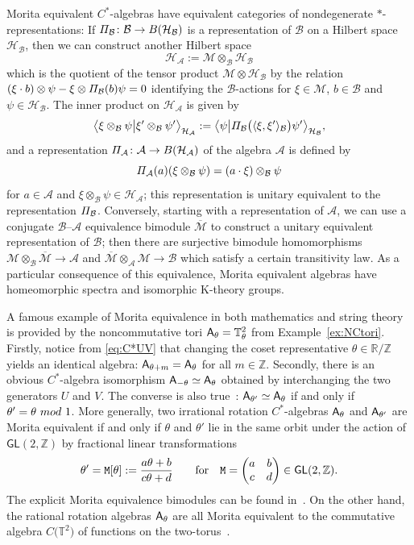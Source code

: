 \documentclass[11pt]{article}
\numberwithin{equation}{section}
\numberwithin{equation}{section}
\newcommand{\Z}{\zed}
\def\A{{\sf A}}
\newcommand{\sfGL}{\mathsf{GL}}
\newcommand{\Pim}{{\mit\Pi}}
\newcommand{\rmB}{{\rm B}}
\newcommand{\zed}{{\mathbb Z}} %
\newcommand{\real}{{\mathbb R}} %
\newcommand{\torus}{{\mathbb T}} %
\def\alg{{\mathcal A}}
\def\balg{{\mathcal B}}
\def\hil{{\mathcal H}}
\def\Mcal{{\mathcal M}}
\begin{document}
Morita equivalent $C^*$-algebras have equivalent categories of
nondegenerate $*$-representations: If $\Pim_\balg\colon \balg\to{\rm B}(\hil_\balg)$ is a
representation of $\balg$ on a Hilbert space $\hil_\balg$, then we can
construct another Hilbert space
\[
\hil_\alg:=\Mcal\otimes_\balg\hil_\balg
\]
which is the quotient of the tensor product $\Mcal\otimes\hil_\balg$ by the relation $(\xi\cdot
b)\otimes\psi-\xi\otimes\Pim_\balg(b)\psi=0$ identifying the
$\balg$-actions for
$\xi\in\Mcal$, $b\in\balg$ and $\psi\in\hil_\balg$. The inner product
on $\hil_\alg$ is given by
\[
\big\langle\xi\otimes_\balg\psi\big|
\xi'\otimes_\balg\psi'\big\rangle_{\hil_\alg} :=
\big\langle\psi\big|\Pim_\balg\big(\langle\xi,\xi'\rangle_\balg
\big)\psi'\big\rangle_{\hil_\balg} ,
\]
and a representation $\Pim_\alg\colon \alg\to\rmB(\hil_\alg)$ of the algebra
$\alg$ is defined by
\[
\Pim_\alg(a)(\xi\otimes_\balg\psi) = (a\cdot\xi) \otimes_\balg\psi
\]
for $a\in\alg$ and $\xi\otimes_\balg\psi\in\hil_\alg$; this
representation is unitary equivalent to the representation
$\Pim_\balg$. Conversely, starting with a representation of $\alg$, we
can use a conjugate $\balg$--$\alg$ equivalence bimodule
$\overline{\Mcal}$ to construct a unitary equivalent representation of
$\balg$; then there are surjective bimodule homomorphisms
$\Mcal\otimes_\balg\overline{\Mcal}\to\alg$ and
$\overline{\Mcal}\otimes_\alg\Mcal\to\balg$ which satisfy a certain
transitivity law. As a particular consequence of this equivalence, Morita
equivalent algebras have homeomorphic spectra and isomorphic K-theory groups.

\begin{Example}\label{ex:NCT2Morita}
A famous example of Morita equivalence in both mathematics and string
theory is provided by the
noncommutative tori ${\sf A}_\theta=\torus_\theta^2$ from
Example~\ref{ex:NCtori}. Firstly, notice from \eqref{eq:C*UV} that
changing the coset representative $\theta\in\real/\Z$ yields an identical
algebra: $\A_{\theta+m}=\A_{\theta}$ for all $m\in\Z$. Secondly, there
is an obvious
$C^*$-algebra isomorphism $\A_{-\theta}\simeq\A_\theta$ obtained by
interchanging the two generators $U$ and $V$. The converse
is also true~\cite{Rieffel1981,Rieffel1982}:
$\A_{\theta'}\simeq\A_{\theta}$ if and only if $\theta'=\theta \ {\rm
 mod}~1$. More generally, two irrational rotation $C^*$-algebras
$\A_\theta$ and $\A_{\theta'}$ are
Morita equivalent if and only if $\theta$ and $\theta'$ lie in the
same orbit under the action of $\sfGL(2,\Z)$ by fractional linear
transformations
\[
\theta'={\tt M}[\theta]:=\frac{a \theta+b}{c \theta+d} \qquad
\mbox{for} \quad {\tt M}=\bigg(\begin{matrix} a & b \\ c &
 d \end{matrix}\bigg) \in \sfGL(2,\Z) .
\]
The explicit Morita equivalence bimodules can be found
in~\cite{Rieffel1981}. On the other hand, the rational rotation
algebras $\A_\theta$ are all Morita equivalent to the commutative
algebra $C\big(\torus^2\big)$ of functions on the
two-torus~\cite{Rieffel1982}.
\end{Example}
\end{document}
